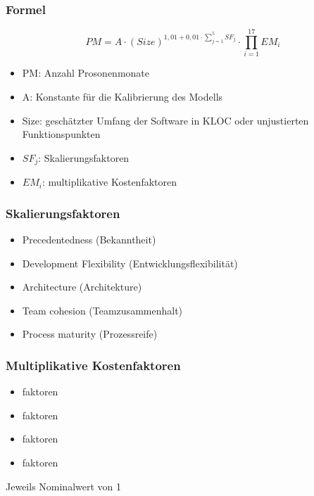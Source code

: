 \subsubsection{Formel}
\[PM=A \cdot (Size)^{1,01+0,01 \cdot \sum^{5}_{j=1}SF_j} \cdot \prod^{17}_{i=1}EM_i\]

\begin{itemize}
    \item PM: Anzahl Prosonenmonate
    \item A: Konstante für die Kalibrierung des Modells
    \item Size: geschätzter Umfang der Software in KLOC oder unjustierten Funktionspunkten
    \item $SF_j$: Skalierungsfaktoren
    \item $EM_i$: multiplikative Kostenfaktoren
\end{itemize}

\subsubsection{Skalierungsfaktoren}
\begin{itemize}
    \item Precedentedness (Bekanntheit)
    \item Development Flexibility (Entwicklungsflexibilität)
    \item Architecture (Architekture)
    \item Team cohesion (Teamzusammenhalt)
    \item Process maturity (Prozessreife)
\end{itemize}
\subsubsection{Multiplikative Kostenfaktoren}
\begin{itemize}
    \item {}faktoren
    \item {}faktoren
    \item {}faktoren
    \item {}faktoren
\end{itemize}
Jeweils Nominalwert von 1

